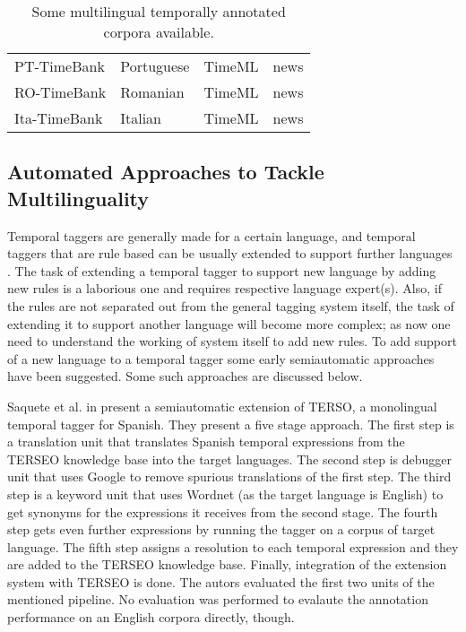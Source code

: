 \begin{table}[H]
\begin{threeparttable}
\begin{tabularx}{\linewidth}{||l   >{\raggedright\arraybackslash}X   >{\raggedright\arraybackslash}p{0.6in}   >{\raggedright\arraybackslash}p{1in}||}
			PT-TimeBank \cite{Costa:Branco:2012c}  & Portuguese & TimeML & news \\
			RO-TimeBank \cite{foruascu2012romanian} & Romanian & TimeML & news \\
			Ita-TimeBank \cite{caselli2011annotating} & Italian & TimeML & news \\
			\hline
		\end{tabularx}
	\end{threeparttable}
	\caption{Some multilingual temporally annotated corpora available.}
	\label{table:1d}
\end{table}

\subsection{Automated Approaches to Tackle Multilinguality}
Temporal taggers are generally made for a certain language, and temporal taggers that are rule based can be usually extended to support further languages \cite{DBLP:series/synthesis/2016Strotgen}. The task of extending a temporal tagger to support new language by adding new rules is a laborious one and requires respective language expert(s). Also, if the rules are not separated out from the general tagging system itself, the task of extending it to support another language will become more complex; as now one need to understand the working of system itself to add new rules. To add support of a new language to a temporal tagger some early semiautomatic approaches have been suggested. Some such approaches are discussed below.

Saquete et al. in \cite{DBLP:conf/micai/SaqueteMM04} present a semiautomatic extension of TERSO, a monolingual temporal tagger for Spanish. They present a five stage approach. The first step is a translation unit that translates Spanish temporal expressions from the TERSEO knowledge base into the target languages. The second step is debugger unit that uses Google to remove spurious translations of the first step. The third step is a keyword unit that uses Wordnet (as the target language is English) to get synonyms for the expressions it receives from the second stage. The fourth step gets even further expressions by running the tagger on a corpus of target language. The fifth step assigns a resolution to each temporal expression and they are added to the TERSEO knowledge base. Finally, integration of the extension system with TERSEO is done. The autors evaluated the first two units of the mentioned pipeline. No evaluation was performed to evalaute the annotation performance on an English corpora directly, though. 

